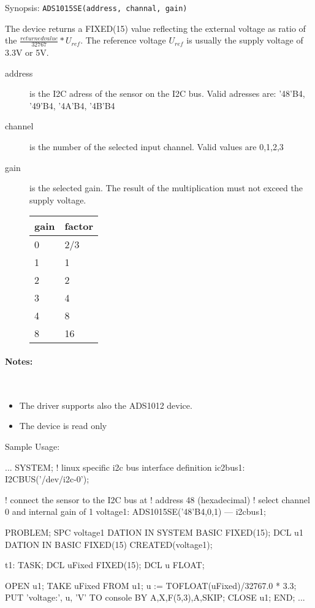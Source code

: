 Synopsis: \texttt{ADS1015SE(address, channal, gain)}

The device returns a FIXED(15) value reflecting the external voltage as ratio
of the $\frac{returned value}{32767}*U_{ref}$.
The reference voltage $U_{ref}$ is usually the supply voltage of 3.3V or 5V.

\begin{description}
\item[address] is the I2C adress of the sensor on the I2C bus.
   Valid adresses are: '48'B4, '49'B4, '4A'B4, '4B'B4
\item[channel] is the number of the selected input channel. 
   Valid values are 0,1,2,3
\item[gain] is the selected gain.
   The result of the multiplication must not exceed the supply voltage.

  \begin{tabular}{l|l}
   gain & factor\\
   \hline 
   0 & 2/3 \\
   1 & 1 \\
   2 & 2 \\
   3 & 4 \\
   4 & 8 \\
   8 & 16 \\
   \end{tabular} 

\end{description}

\paragraph{Notes:} \ 
\begin{itemize}
\item The driver supports also the ADS1012 device.
\item The device is read only
\end{itemize}

Sample Usage:
\begin{PEARLCode}
...
SYSTEM;
   ! linux specific i2c bus interface definition
   ic2bus1: I2CBUS('/dev/i2c-0');

   ! connect the sensor to the I2C bus at 
   ! address 48 (hexadecimal)
   ! select channel 0 and internal gain of 1
   voltage1: ADS1015SE('48'B4,0,1) --- i2cbus1;

PROBLEM;
   SPC voltage1 DATION IN SYSTEM BASIC FIXED(15);
   DCL u1 DATION IN BASIC FIXED(15) CREATED(voltage1);

t1: TASK;
   DCL uFixed FIXED(15);
   DCL u FLOAT;
 
   OPEN u1;
   TAKE uFixed FROM u1;
   u := TOFLOAT(uFixed)/32767.0 * 3.3;
   PUT 'voltage:', u, 'V' TO console BY A,X,F(5,3),A,SKIP;
   CLOSE u1;
END;
...
\end{PEARLCode}



